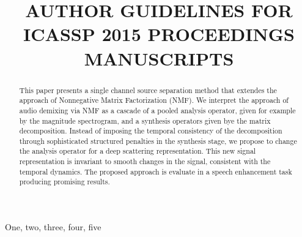 \documentclass{article}
\title{AUTHOR GUIDELINES FOR ICASSP 2015 PROCEEDINGS MANUSCRIPTS}
\begin{document}
%
\maketitle
%
\begin{abstract}
This paper presents a single channel source separation method
that extendes the approach of Nonnegative Matrix Factorization (NMF).
We interpret the approach of audio demixing via NMF as a cascade of a pooled analysis operator, given
for example by the magnitude spectrogram, and a synthesis operators given bye the matrix decomposition.
Instead of imposing the temporal consistency of the decomposition through
sophisticated structured penalties in the synthesis stage,
we propose to change the analysis operator for a deep scattering representation. This new signal representation is
invariant to smooth changes in the signal, consistent with the temporal dynamics.
The proposed approach is evaluate in a speech enhancement task producing promising results.
\end{abstract}
%
\begin{keywords}
One, two, three, four, five
\end{keywords}
%








\end{document}
